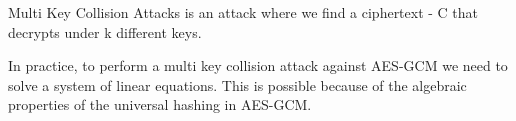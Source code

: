 Multi Key Collision Attacks is an attack where we find a ciphertext - C that decrypts under k different keys.

In practice, to perform a multi key collision attack against AES-GCM
we need to solve a system of linear equations.
This is possible because of the algebraic properties of the universal hashing in AES-GCM.